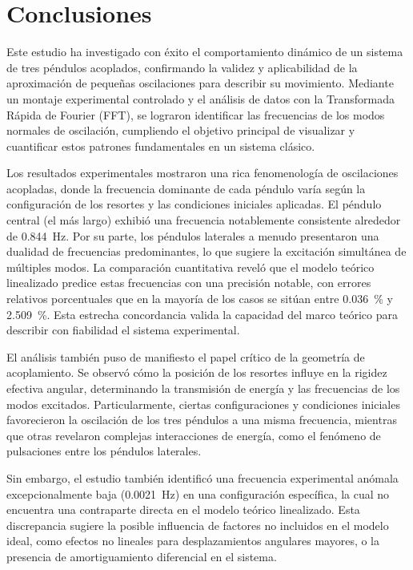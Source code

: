 \section{Conclusiones}

Este estudio ha investigado con \'exito el comportamiento din\'amico
de un sistema de tres p\'endulos acoplados, confirmando la validez y
aplicabilidad de la aproximaci\'on de peque\~nas oscilaciones para
describir su movimiento. Mediante un montaje experimental controlado y
el an\'alisis de datos con la Transformada R\'apida de Fourier (FFT),
se lograron identificar las frecuencias de los modos normales de
oscilaci\'on, cumpliendo el objetivo principal de visualizar y
cuantificar estos patrones fundamentales en un sistema cl\'asico.

Los resultados experimentales mostraron una rica fenomenolog\'ia de
oscilaciones acopladas, donde la frecuencia dominante de cada p\'endulo
var\'ia seg\'un la configuraci\'on de los resortes y las condiciones
iniciales aplicadas. El p\'endulo central (el m\'as largo) exhibi\'o
una frecuencia notablemente consistente alrededor de \qty{0.844}{\Hz}.
Por su parte, los p\'endulos laterales a menudo presentaron una
dualidad de frecuencias predominantes, lo que sugiere la excitaci\'on
simult\'anea de m\'ultiples modos. La comparaci\'on cuantitativa revel\'o
que el modelo te\'orico linealizado predice estas frecuencias con
una precisi\'on notable, con errores relativos porcentuales que en
la mayor\'ia de los casos se sit\'uan entre \qty{0.036}{\percent} y
\qty{2.509}{\percent}. Esta estrecha concordancia valida la capacidad
del marco te\'orico para describir con fiabilidad el sistema
experimental.

El an\'alisis tambi\'en puso de manifiesto el papel cr\'itico de la
geometr\'ia de acoplamiento. Se observ\'o c\'omo la posici\'on de los
resortes influye en la rigidez efectiva angular, determinando la
transmisi\'on de energ\'ia y las frecuencias de los modos excitados.
Particularmente, ciertas configuraciones y condiciones iniciales
favorecieron la oscilaci\'on de los tres p\'endulos a una misma
frecuencia, mientras que otras revelaron complejas interacciones de
energ\'ia, como el fen\'omeno de pulsaciones entre los p\'endulos
laterales.

Sin embargo, el estudio tambi\'en identific\'o una frecuencia
experimental an\'omala excepcionalmente baja (\qty{0.0021}{\Hz}) en
una configuraci\'on espec\'ifica, la cual no encuentra una
contraparte directa en el modelo te\'orico linealizado. Esta
discrepancia sugiere la posible influencia de factores no incluidos
en el modelo ideal, como efectos no lineales para desplazamientos
angulares mayores, o la presencia de amortiguamiento diferencial en
el sistema.

